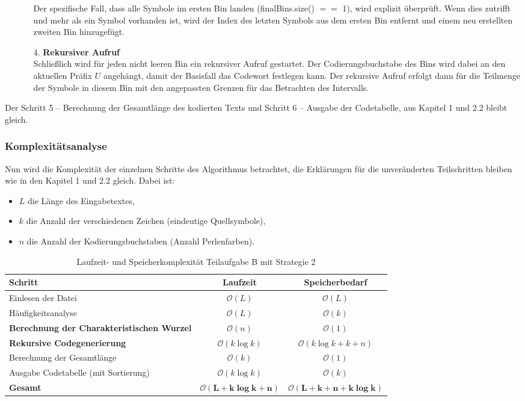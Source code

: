 \documentclass[a4paper,10pt,ngerman]{scrartcl}
\begin{document}
\begin{enumerate}
\begin{enumerate}
    Der spezifische Fall, dass alle Symbole im ersten Bin landen (finalBins.size() $==$ 1), wird explizit überprüft. Wenn dies zutrifft und mehr als ein Symbol vorhanden ist, wird der Index des letzten Symbols aus dem ersten Bin entfernt und einem neu erstellten zweiten Bin hinzugefügt. 
    \item [4.] \textbf{Rekursiver Aufruf}\\
    Schließlich wird für jeden nicht leeren Bin ein rekursiver Aufruf gestartet. Der Codierungsbuchstabe des Bins wird dabei an den aktuellen Präfix $U$ angehängt, damit der Basisfall das Codewort festlegen kann. Der rekursive Aufruf erfolgt dann für die Teilmenge der Symbole in diesem Bin mit den angepassten Grenzen für das Betrachten des Intervalls. 
  \end{enumerate}
\end{enumerate}

Der Schritt 5 – Berechnung der Gesamtlänge des kodierten Texts und Schritt 6 – Ausgabe der Codetabelle, aus Kapitel 1 und 2.2 bleibt gleich. 

\subsubsection{Komplexitätsanalyse}
Nun wird die Komplexität der einzelnen Schritte des Algorithmus betrachtet, die Erklärungen für die unveränderten Teilschritten bleiben wie in den Kapitel 1 und 2.2 gleich. Dabei ist:
\begin{itemize}
  \item $L$ die Länge des Eingabetextes,
  \item $k$ die Anzahl der verschiedenen Zeichen (eindeutige Quellsymbole),
  \item $n$ die Anzahl der Kodierungsbuchstaben (Anzahl Perlenfarben).
\end{itemize}
\vspace{0.2cm}

\begin{table}[H]
\centering
\begin{tabular}{|l|c|c|}
\hline
\textbf{Schritt} & \textbf{Laufzeit} & \textbf{Speicherbedarf} \\
\hline
Einlesen der Datei & $\mathcal{O}(L)$ & $\mathcal{O}(L)$ \\
Häufigkeitsanalyse & $\mathcal{O}(L)$ & $\mathcal{O}(k)$ \\
\textbf{Berechnung der Charakteristischen Wurzel} & $\mathcal{O}(n)$ & $\mathcal{O}(1)$ \\
\textbf{Rekursive Codegenerierung} & $\mathcal{O}(k \log k)$ & $\mathcal{O}(k \log k + k + n)$ \\
Berechnung der Gesamtlänge & $\mathcal{O}(k)$ & $\mathcal{O}(1)$ \\
Ausgabe Codetabelle (mit Sortierung) & $\mathcal{O}(k \log k)$ & $\mathcal{O}(k)$ \\
\hline
\textbf{Gesamt} & $\boldsymbol{\mathcal{O}(L + k \log k + n)}$ & $\boldsymbol{\mathcal{O}(L + k + n + k \log k)}$ \\
\hline
\end{tabular}
\caption{Laufzeit- und Speicherkomplexität Teilaufgabe B mit Strategie 2}
\end{table}
\end{document}
